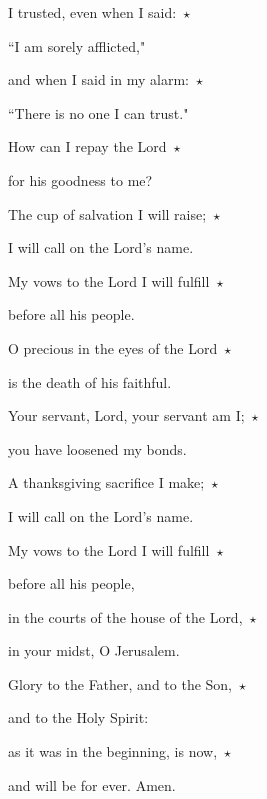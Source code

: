 \noindent I trusted, even when I said:~$\star$~\nopagebreak

``I am sorely afflicted,"

\noindent and when I said in my alarm:~$\star$~\nopagebreak

``There is no one I can trust."

\noindent How can I repay the Lord~$\star$~\nopagebreak

for his goodness to me?

\noindent The cup of salvation I will raise;~$\star$~\nopagebreak

I will call on the Lord’s name.

\noindent My vows to the Lord I will fulfill~$\star$~\nopagebreak

before all his people.

\noindent O precious in the eyes of the Lord~$\star$~\nopagebreak

is the death of his faithful.

\noindent Your servant, Lord, your servant am I;~$\star$~\nopagebreak

you have loosened my bonds.

\noindent A thanksgiving sacrifice I make;~$\star$~\nopagebreak

I will call on the Lord’s name.

\noindent My vows to the Lord I will fulfill~$\star$~\nopagebreak

before all his people,

\noindent in the courts of the house of the Lord,~$\star$~\nopagebreak

in your midst, O Jerusalem.

\noindent Glory to the Father, and to the Son,~$\star$~\nopagebreak

and to the Holy Spirit:

\noindent as it was in the beginning, is now,~$\star$~\nopagebreak

and will be for ever. Amen.
